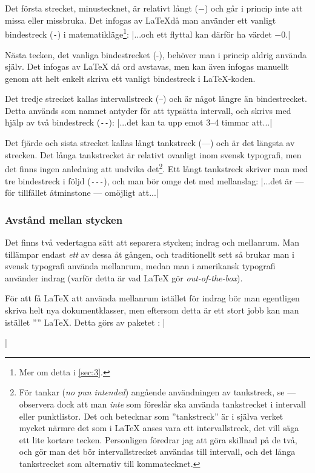 \documentclass[lang=sv,ptsize=10pt,font=none,nomath,titles=bf,../../a4.tex]{subfiles}
\begin{document}
Det första strecket, minustecknet, är relativt långt (\(-\)) och går i
princip inte att missa eller missbruka. Det infogas av \LaTeX då man
använder ett vanligt bindestreck (\verb|-|) i matematikläge\footnote{
Mer om detta i \cref{sec:3}.}:
\latex|...och ett flyttal kan därför ha värdet \(-0\).|

Nästa tecken, det vanliga bindestrecket (-), behöver man i princip aldrig
använda själv. Det infogas av \LaTeX{} då ord avstavas, men kan även
infogas manuellt genom att helt enkelt skriva ett vanligt bindestreck
i \LaTeX{}-koden.

Det tredje strecket kallas intervallstreck (–) och är något längre än
bindestrecket. Detta används som namnet antyder för att typsätta
intervall, och skrivs med hjälp av två bindestreck (\verb|--|):
\latex|...det kan ta upp emot 3--4 timmar att...|

Det fjärde och sista strecket kallas långt tankstreck (—) och är det längsta av
strecken. Det långa tankstrecket är relativt ovanligt inom svensk typografi, men det
finns ingen anledning att undvika det\footnote{För tankar (\emph{no pun
intended}) angående användningen av tankstreck, se 
\textcite[\ppno~46–47]{LIU98} — observera dock att man \emph{inte} som 
\citeauthor*{LIU98} föreslår ska använda tankstrecket i intervall eller
punktlistor. Det \textcite{Sprakradet08} och \citeauthor*{LIU98} betecknar som
”tankstreck” är i själva verket mycket närmre det som i \LaTeX{} anses vara ett
intervallstreck, det vill säga ett lite kortare tecken. Personligen föredrar jag 
att göra skillnad på de två, och gör man det bör intervallstrecket användas till
intervall, och det långa tankstrecket som alternativ till kommatecknet.}.
Ett långt tankstreck skriver man med tre bindestreck i följd
(\verb|---|), och man bör omge det med mellanslag:
\latex|...det är --- för tillfället åtminstone --- omöjligt att...|

\subsubsection{Avstånd mellan stycken}
Det finns två vedertagna sätt att separera stycken; indrag och
mellanrum. Man tillämpar endast \emph{ett} av dessa åt gången, och
traditionellt sett så brukar man i svensk typografi använda mellanrum,
medan man i amerikansk typografi använder indrag (varför detta är vad
\LaTeX{} gör \emph{out-of-the-box}).

För att få \LaTeX{} att använda mellanrum istället för indrag bör man
egentligen skriva helt nya dokumentklasser, men eftersom detta är ett
stort jobb kan man istället ”” \LaTeX{}. Detta görs av
paketet :
\latex|\usepackage{parskip}|
\end{document}
